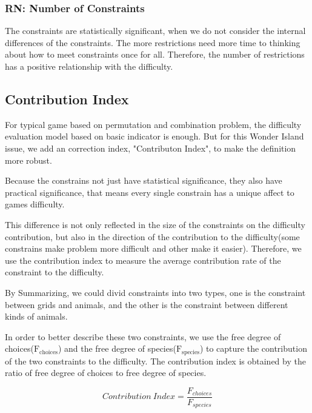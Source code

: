 \documentclass{mcmthesis}
\begin{document}
				
			\subsubsection{RN: Number of Constraints}
			
				The constraints are statistically significant, when we do not consider the internal differences of the constraints. The more restrictions need  more time to thinking about how to meet constraints once for all. Therefore, the number of restrictions has a positive relationship with the difficulty.	
				

				
		\subsection{Contribution Index}
			
			For typical game based on permutation and combination problem, the difficulty evaluation model based on basic indicator is enough. But for this Wonder Island issue, we add an correction index, "Contributon Index", to make the definition more robust.
			
			Because the constrains not just have statistical significance, they also have practical significance, that means every single constrain has a unique affect to games difficulty.
			
			This difference is not only reflected in the size of the constraints on the difficulty contribution, but also in the direction of the contribution to the difficulty(some constrains make problem more difficult and other make it easier). Therefore, we use the contribution index to measure the average contribution rate of the constraint to the difficulty.
			
			
			By Summarizing, we could divid constraints into two types, one is the constraint between grids and animals, and the other is the constraint between different kinds of animals. 
			
			In order to better describe these two constraints, we use the free degree of choices($\mathrm{F_{choices}}$) and the free degree of species($\mathrm{F_{species}}$) to capture the contribution of the two constraints to the difficulty. The contribution index is obtained by the ratio of free degree of choices to free degree of species.
			
			\begin{equation}
			Contribution\ Index = \frac{F_{choices}}{F_{species}}
			\end{equation}
		
\end{document}
